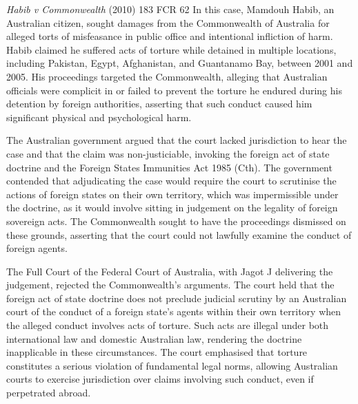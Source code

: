 \begin{casedetails}{\textit{Habib v Commonwealth} (2010) 183 FCR 62}
    \flushleft
    In this case, Mamdouh Habib, an Australian citizen, sought damages from the Commonwealth of Australia for alleged torts of misfeasance in public office and intentional infliction of harm. Habib claimed he suffered acts of torture while detained in multiple locations, including Pakistan, Egypt, Afghanistan, and Guantanamo Bay, between 2001 and 2005. His proceedings targeted the Commonwealth, alleging that Australian officials were complicit in or failed to prevent the torture he endured during his detention by foreign authorities, asserting that such conduct caused him significant physical and psychological harm.
    
    \vspace{\baselineskip}
    
    The Australian government argued that the court lacked jurisdiction to hear the case and that the claim was non-justiciable, invoking the foreign act of state doctrine and the Foreign States Immunities Act 1985 (Cth). The government contended that adjudicating the case would require the court to scrutinise the actions of foreign states on their own territory, which was impermissible under the doctrine, as it would involve sitting in judgement on the legality of foreign sovereign acts. The Commonwealth sought to have the proceedings dismissed on these grounds, asserting that the court could not lawfully examine the conduct of foreign agents.
    
    \vspace{\baselineskip}
    
    The Full Court of the Federal Court of Australia, with Jagot J delivering the judgement, rejected the Commonwealth's arguments. The court held that the foreign act of state doctrine does not preclude judicial scrutiny by an Australian court of the conduct of a foreign state's agents within their own territory when the alleged conduct involves acts of torture. Such acts are illegal under both international law and domestic Australian law, rendering the doctrine inapplicable in these circumstances. The court emphasised that torture constitutes a serious violation of fundamental legal norms, allowing Australian courts to exercise jurisdiction over claims involving such conduct, even if perpetrated abroad.
    
    \vspace{\baselineskip}
    

\end{casedetails}
